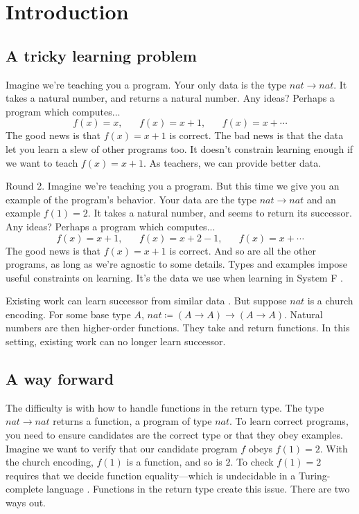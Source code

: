 \documentclass[sigplan,10pt]{acmart}
\theoremstyle{mytheoremstyle}
\begin{document}
\maketitle


\section{Introduction}
\subsection{A tricky learning problem}

Imagine we're teaching you a program. Your only data is the type $nat \!\to\! nat$. It takes a natural number, and returns a natural number. Any ideas? Perhaps a program which computes...
$$f(x) = x, \;\;\;\;\;\;f(x) = x + 1,\;\;\;\;\;\; f(x) = x + \cdots$$
The good news is that $f(x) = x + 1$ is correct. The bad news is that the data let you learn a slew of other programs too. It doesn't constrain learning enough if we want to teach $f(x) = x + 1$. As teachers, we can provide better data.

Round 2. Imagine we're teaching you a program. But this time we give you an example of the program's behavior. Your data are the type $nat \!\to\! nat$ and an example $f(1) = 2$. It takes a natural number, and seems to return its successor. Any ideas? Perhaps a program which computes...
$$f(x) = x + 1,\;\;\;\;\;\; f(x) = x + 2 - 1,\;\;\;\;\;\; f(x) = x + \cdots$$
The good news is that $f(x) = x + 1$ is correct. And so are all the other programs, as long as we're agnostic to some details. Types and examples impose useful constraints on learning. It's the data we use when learning in System F \cite{girard1989proofs}.

Existing work can learn successor from similar data \cite{osera2015program, polikarpova2016program}. But suppose $nat$ is a church encoding. For some base type $A$, $nat \coloneqq (A \to A) \to (A \to A)$. Natural numbers are then higher-order functions. They take and return functions. In this setting, existing work can no longer learn successor. 

\subsection{A way forward}

The difficulty is with how to handle functions in the return type. The type $nat \!\to\! nat$ returns a function, a program of type $nat$. To learn correct programs, you need to ensure candidates are the correct type or that they obey examples. Imagine we want to verify that our candidate program $f$ obeys $f(1)=2$. With the church encoding, $f(1)$ is a function, and so is $2$. To check $f(1)=2$ requires that we decide function equality---which is undecidable in a Turing-complete language \cite{sipser2006introduction}. Functions in the return type create this issue. There are two ways out.
\end{document}
